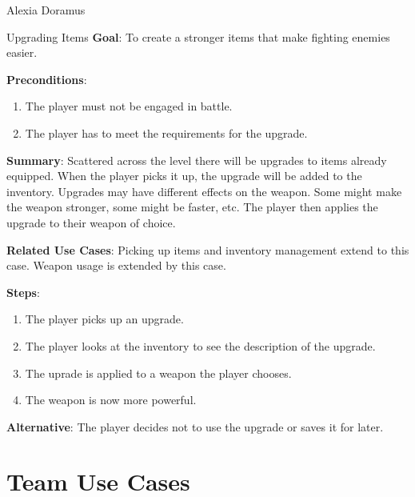 \documentclass[12pt]{report}
\begin{document}
\begin{section}{Alexia Doramus}
\begin{subsection}{Upgrading Items}
\textbf{Goal}:
To create a stronger items that make fighting enemies easier.

\textbf{Preconditions}:
\begin{enumerate}
\item The player must not be engaged in battle.
\item The player has to meet the requirements for the upgrade.
\end{enumerate}

\textbf{Summary}:
Scattered across the level there will be upgrades to items already equipped. When the player picks it up, the upgrade will be added to the inventory. Upgrades may have different effects on the weapon. Some might make the weapon stronger, some might be faster, etc. The player then applies the upgrade to their weapon of choice.

\textbf{Related Use Cases}:
Picking up items and inventory management extend to this case. Weapon usage is extended by this case.

\textbf{Steps}:
\begin{enumerate}
\item The player picks up an upgrade.
\item The player looks at the inventory to see the description of the upgrade.
\item The uprade is applied to a weapon the player chooses.
\item The weapon is now more powerful.
\end{enumerate}

\textbf{Alternative}:
The player decides not to use the upgrade or saves it for later.
\end{subsection}
\end{section}

\chapter{Team Use Cases}

\end{document}
